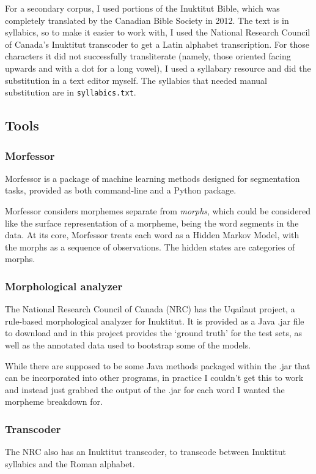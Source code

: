 \documentclass[10pt]{article}
\begin{document}
For a secondary corpus, I used portions of the Inuktitut Bible, which was completely translated by the Canadian Bible Society in 2012.\cite{bible} The text is in syllabics, so to make it easier to work with, I used the National Research Council of Canada's Inuktitut transcoder to get a Latin alphabet transcription. For those characters it did not successfully transliterate (namely, those oriented facing upwards and with a dot for a long vowel), I used a syllabary resource\cite{syllabics} and did the substitution in a text editor myself. The syllabics that needed manual substitution are in \texttt{syllabics.txt}.

\subsection{Tools}

\subsubsection{Morfessor}
Morfessor\cite{morfessor} is a package of machine learning methods designed for segmentation tasks, provided as both command-line and a Python package.

Morfessor considers morphemes separate from \emph{morphs}, which could be considered like the surface representation of a morpheme, being the word segments in the data. At its core, Morfessor treats each word as a Hidden Markov Model, with the morphs as a sequence of observations. The hidden states are categories of morphs.\cite{formula}

\subsubsection{Morphological analyzer}
The National Research Council of Canada (NRC) has the Uqailaut project, a rule-based morphological analyzer for Inuktitut.\cite{analyzer} It is provided as a Java .jar file to download and in this project provides the `ground truth' for the test sets, as well as the annotated data used to bootstrap some of the models.

While there are supposed to be some Java methods packaged within the .jar that can be incorporated into other programs, in practice I couldn't get this to work and instead just grabbed the output of the .jar for each word I wanted the morpheme breakdown for.\cite{exec_cmd_java}

\subsubsection{Transcoder}
The NRC also has an Inuktitut transcoder, to transcode between Inuktitut syllabics and the Roman alphabet.\cite{transcoder}
\end{document}
